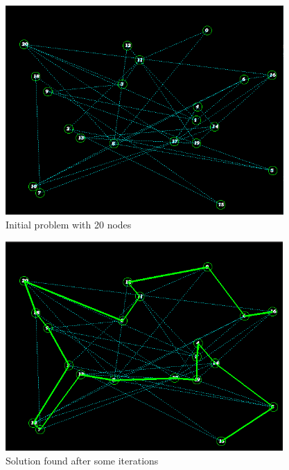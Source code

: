 \documentclass{article}
\begin{document}
    \begin{figure}
        \includegraphics[width=\linewidth, height=8cm]{img/init.png}
        \caption{Initial problem with 20 nodes}
        \label{fig:init}
    \end{figure}
    \begin{figure}
        \includegraphics[width=\linewidth, height=8cm]{img/sol.png}
        \caption{Solution found after some iterations}
        \label{fig:sol}
    \end{figure}
\end{document}
